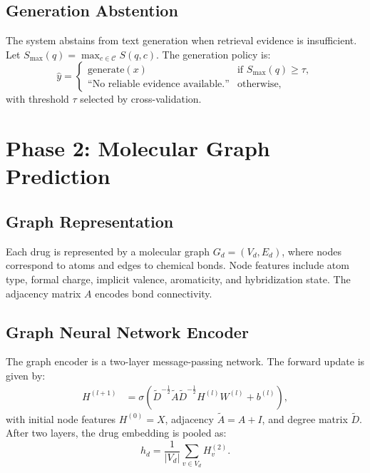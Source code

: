 \documentclass[conference]{IEEEtran}
\begin{document}
\subsection{Generation Abstention}
The system abstains from text generation when retrieval evidence is insufficient. Let $S_{\max}(q) = \max_{c\in\mathcal{C}} S(q,c)$. The generation policy is:
\begin{equation}
    \hat{y} = \begin{cases}
      \text{generate}(x) & \text{if } S_{\max}(q) \ge \tau, \\
      \text{``No reliable evidence available.''} & \text{otherwise,}
    \end{cases}
\end{equation}
with threshold $\tau$ selected by cross-validation.

\section{Phase 2: Molecular Graph Prediction}
\subsection{Graph Representation}
Each drug is represented by a molecular graph $G_d=(V_d,E_d)$, where nodes correspond to atoms and edges to chemical bonds. Node features include atom type, formal charge, implicit valence, aromaticity, and hybridization state. The adjacency matrix $A$ encodes bond connectivity.

\subsection{Graph Neural Network Encoder}
The graph encoder is a two-layer message-passing network. The forward update is given by:
\begin{align}
    H^{(l+1)} &= \sigma\left( \tilde{D}^{-\frac{1}{2}} \tilde{A} \tilde{D}^{-\frac{1}{2}} H^{(l)} W^{(l)} + b^{(l)} \right),
\end{align}
with initial node features $H^{(0)} = X$, adjacency $\tilde{A} = A + I$, and degree matrix $\tilde{D}$. After two layers, the drug embedding is pooled as:
\begin{equation}
    h_d = \frac{1}{|V_d|} \sum_{v \in V_d} H_v^{(2)}.
\end{equation}
\end{document}
